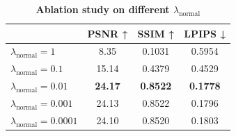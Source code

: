 \begin{table}[t]
\centering
\small
\caption{\textbf{Ablation study on different $\lambda_{\text{normal}}$}}
\label{tab:lambda_normal}
\begin{tabular}{lccc}
    \toprule
      & PSNR ↑ & SSIM ↑ & LPIPS ↓ \\
    \midrule
    $\lambda_{\text{normal}} = 1$ &8.35  &0.1031  &0.5954  \\
    $\lambda_{\text{normal}} = 0.1$ &15.14  &0.4379  &0.4529  \\
    $\lambda_{\text{normal}} = 0.01$ &\textbf{24.17}  &\textbf{0.8522}  &\textbf{0.1778}  \\
    $\lambda_{\text{normal}} = 0.001$ & 24.13  & 0.8522  &0.1796  \\
    $\lambda_{\text{normal}} = 0.0001$ & 24.10  & 0.8520  &0.1803  \\
    \bottomrule
\end{tabular}
\end{table}